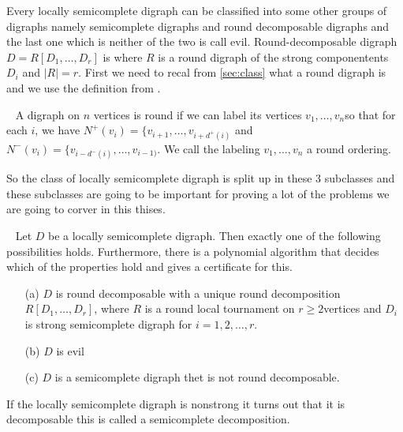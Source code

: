 
Every locally semicomplete digraph can be classified into some other groups of digraphs namely semicomplete digraphs and round decomposable digraphs and the last one which is neither of the two is call evil. Round-decomposable digraph $D=R[D_1,\dots,D_r]$ is where $R$ is a round digraph of the strong componentents $D_i$ and $|R|=r$.
First we need to recal from \autoref{sec:class} what a round digraph is and we use the definition from \cite{bangJGT77}.
\begin{definition}~\cite{bangJGT77}
    A digraph on $n$ vertices is round if we can label its vertices $v_1,\dots ,v_n$so that for each $i$, we have $N^+(v_i)=\lbrace v_{i+1},\dots ,v_{i+d^+(i)}$ and $N^-(v_i)=\lbrace v_{i-d^-(i)},\dots ,v_{i-1)}$. We call the labeling $v_1,\dots ,v_n$ a round ordering. 
\end{definition}
So the class of locally semicomplete digraph is split up in these 3 subclasses and these subclasses are going to be important for proving a lot of the problems we are going to corver in this thises.
\begin{thm}~\cite{bangJGT85}
    Let $D$ be a locally semicomplete digraph. Then exactly one of the following possibilities holds. Furthermore, there is a polynomial algorithm that decides which of the properties hold and gives a certificate for this.
    \begin{itemize}
        \item[(a)] $D$ is round decomposable with a unique round decomposition $R[D_1,\dots ,D_r]$, where $R$ is a round local tournament on $r\geq 2$vertices and $D_i$ is strong semicomplete digraph for $i=1,2,\dots,r$.
        \item[(b)] $D$ is evil 
        \item[(c)] $D$ is a semicomplete digraph thet is not round decomposable. 
    \end{itemize}
    \label{thm:treesubclasses}
\end{thm}
If the locally semicomplete digraph is nonstrong it turns out that it is decomposable this is called a semicomplete decomposition. 
